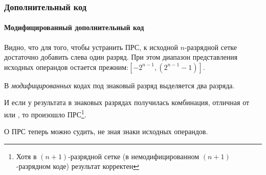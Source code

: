\begin{frame}
    \frametitle{Дополнительный код}
    \framesubtitle{Модифицированный дополнительный код}
    
    Видно, что для того, чтобы устранить ПРС, к исходной $n$-разрядной сетке достаточно добавить слева один разряд. При этом диапазон представления исходных операндов остается прежним:$[-2^{n-1},(2^{n-1} - 1)]$. 
    
    \begin{block}{}
        В \emph{модифицированных} кодах под знаковый разряд выделяется два разряда.
    \end{block}

    И если у результата в знаковых разрядах получилась комбинация, отличная от  или , то произошло ПРС\footnote{Хотя в $(n+1)$-разрядной сетке (в немодифицированном $(n+1)$-разрядном коде) результат корректен}.
    
    \begin{block}{}
        О ПРС теперь можно судить, не зная знаки исходных операндов.
    \end{block}
\end{frame}

